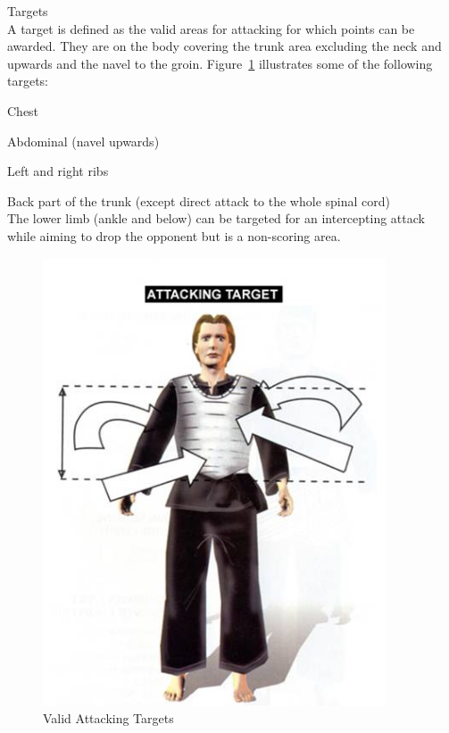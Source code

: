 \begin{legal}
\begin{legal}
    \item Targets\\
    A target is defined as the valid areas for attacking for which points can be awarded.  They
    are on the body covering the trunk area excluding the neck and upwards and the navel to the groin.
    Figure~\ref{fig:attacking_targets} illustrates some of the following targets:
        \begin{legal}
        \item Chest
        \item Abdominal (navel upwards)
        \item Left and right ribs
        \item Back part of the trunk (except direct attack to the whole spinal cord)
        \\
    The lower limb (ankle and below) can be targeted for an intercepting attack while aiming to
    drop the opponent but is a non-scoring area.

        \begin{figure}[h!]
            \centering
            \includegraphics[width=4.0in]{images/attacking_targets}
            \caption{Valid Attacking Targets}
            \label{fig:attacking_targets}
        \end{figure}

        \end{legal}
    

\end{legal}
\end{legal}
